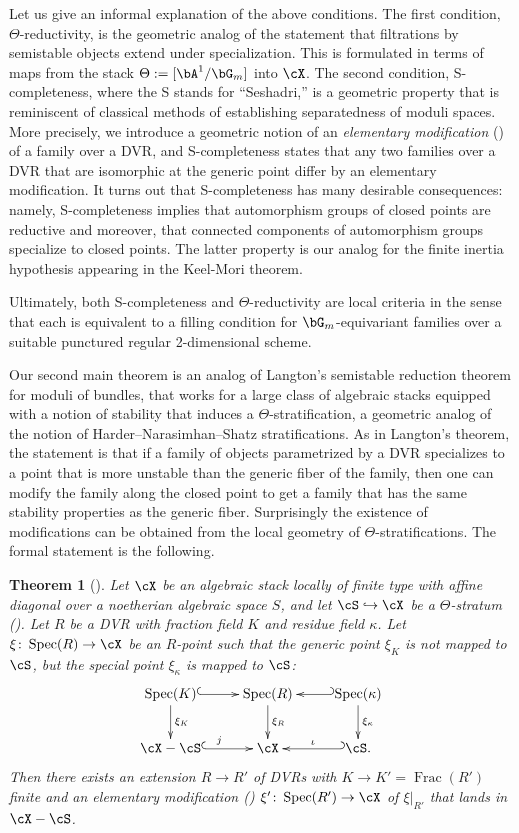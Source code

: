 \documentclass[a4paper]{amsart}
\numberwithin{equation}{section}
\theoremstyle{plain}
\newtheorem{thmx}{Theorem}
\theoremstyle{definition}
\DeclareMathOperator{\Spec}{Spec}
\DeclareMathOperator{\Frac}{Frac}
\newcommand{\co}{\colon}
\def\Scomplete{\textsf{S}-complete}
\begin{document}
Let us give an informal explanation of the above conditions.
The first condition, $\Theta$-reductivity, is the geometric analog of the statement that filtrations by semistable objects extend under specialization. This is formulated in terms of maps from the stack $\Theta:=[\bA^1/\bG_m]$ into $\cX$. 
The second condition, \Scomplete ness,
where the \textsf{S} stands for ``Seshadri,'' is a geometric property that is reminiscent of classical methods of establishing separatedness of moduli spaces. 
{More precisely, we introduce a geometric notion of an \emph{elementary modification} () of a family over a DVR, and  {\textsf{S}}-completeness states that any two families over a DVR that are isomorphic at the generic point differ by an elementary modification.}  It turns out that {\textsf{S}}-completeness has many desirable consequences:  namely, {\textsf{S}}-completeness implies that automorphism groups of closed points are reductive and moreover, that connected components of automorphism groups specialize to closed points. The latter property is our analog for the finite inertia hypothesis appearing in the Keel-Mori theorem.

Ultimately, both  {\textsf{S}}-completeness and $\Theta$-reductivity are local criteria in the sense that each is equivalent to a filling condition for $\bG_m$-equivariant families over a suitable punctured regular 2-dimensional scheme.

Our second main theorem is an analog of Langton's semistable reduction theorem \cite{langton} for moduli of bundles, that works for a large class of algebraic stacks equipped with a notion of stability that induces a  $\Theta$-stratification, a geometric analog of the notion of Harder--Narasimhan--Shatz stratifications. As in Langton's theorem, the statement is that if a family of objects parametrized by a DVR specializes to a point that is more unstable than the generic fiber of the family, then one can modify the family along the closed point to get a family that has the same stability properties as the generic fiber. Surprisingly the existence of modifications can be obtained from the local geometry of $\Theta$-stratifications. The formal statement is the following. 

\begin{thmx}[] \label{T:B} 
	Let $\cX$ be an algebraic stack locally of finite type with affine diagonal over a noetherian algebraic space $S$, and let $\cS \hookrightarrow \cX$ be a $\Theta$-stratum (). Let $R$ be a DVR with fraction field $K$ and residue field $\kappa$. Let $\xi \co \Spec(R) \to \cX$ be an $R$-point such that the generic point $\xi_K$ is not mapped to $\cS$, but the special point $\xi_{\kappa}$ is mapped to $\cS$: 
	$$\xymatrix{
		\Spec(K) \ar@{^(->}[r]\ar[d]^{\xi_K} & \Spec(R)\ar[d]^{\xi_R} & \Spec(\kappa)\ar@{_(->}[l]\ar[d]^{\xi_{\kappa}} \\
		\cX-\cS \ar@{^(->}[r]^{j}& \cX & \ar@{_(->}[l]_{\iota}\cS.}$$
Then there exists an extension $R \to R'$ of DVRs with $K \to K'=\Frac(R')$ finite and an elementary modification () $\xi' \co \Spec(R') \to \cX$ of $\xi|_{R'}$ that lands in $\cX -\cS$.
\end{thmx}
\end{document}
